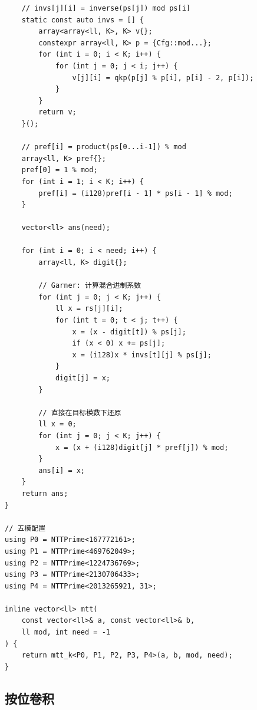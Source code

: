 \begin{lstlisting}
    // invs[j][i] = inverse(ps[j]) mod ps[i]
    static const auto invs = [] {
        array<array<ll, K>, K> v{};
        constexpr array<ll, K> p = {Cfg::mod...};
        for (int i = 0; i < K; i++) {
            for (int j = 0; j < i; j++) {
                v[j][i] = qkp(p[j] % p[i], p[i] - 2, p[i]);
            }
        }
        return v;
    }();

    // pref[i] = product(ps[0...i-1]) % mod
    array<ll, K> pref{};
    pref[0] = 1 % mod;
    for (int i = 1; i < K; i++) {
        pref[i] = (i128)pref[i - 1] * ps[i - 1] % mod;
    }

    vector<ll> ans(need);

    for (int i = 0; i < need; i++) {
        array<ll, K> digit{};

        // Garner: 计算混合进制系数
        for (int j = 0; j < K; j++) {
            ll x = rs[j][i];
            for (int t = 0; t < j; t++) {
                x = (x - digit[t]) % ps[j];
                if (x < 0) x += ps[j];
                x = (i128)x * invs[t][j] % ps[j];
            }
            digit[j] = x;
        }

        // 直接在目标模数下还原
        ll x = 0;
        for (int j = 0; j < K; j++) {
            x = (x + (i128)digit[j] * pref[j]) % mod;
        }
        ans[i] = x;
    }
    return ans;
}

// 五模配置
using P0 = NTTPrime<167772161>;
using P1 = NTTPrime<469762049>;
using P2 = NTTPrime<1224736769>;
using P3 = NTTPrime<2130706433>;
using P4 = NTTPrime<2013265921, 31>;

inline vector<ll> mtt(
    const vector<ll>& a, const vector<ll>& b,
    ll mod, int need = -1
) {
    return mtt_k<P0, P1, P2, P3, P4>(a, b, mod, need);
}
\end{lstlisting}

\subsection{按位卷积}
\par

